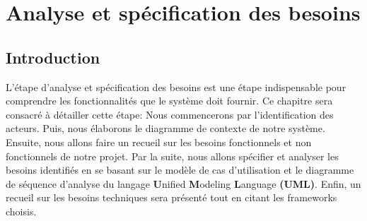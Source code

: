 \vfill 
\chapter{Analyse et spécification des besoins}
\label{chap:analyse-specification-besoins}
\vfill 
\minitoc
\mtcaddchapter
\vfill 

\newpage

\section*{Introduction}
\justifying
L’étape d’analyse et spécification des besoins est une étape indispensable pour comprendre les fonctionnalités que le système doit fournir. Ce chapitre sera consacré à détailler cette étape: Nous commencerons par l’identification des acteurs. Puis, nous élaborons le diagramme de contexte de notre système. Ensuite, nous allons faire un recueil sur  les besoins fonctionnels et non fonctionnels de notre projet. Par la suite, nous allons spécifier et analyser les besoins identifiés en se basant sur le modèle de cas d’utilisation et le diagramme de séquence d'analyse du langage  \textbf{U}nified  \textbf{M}odeling  \textbf{L}anguage \textbf{(UML)}. Enfin, un recueil sur les besoins techniques sera présenté tout en citant les frameworks choisis.


